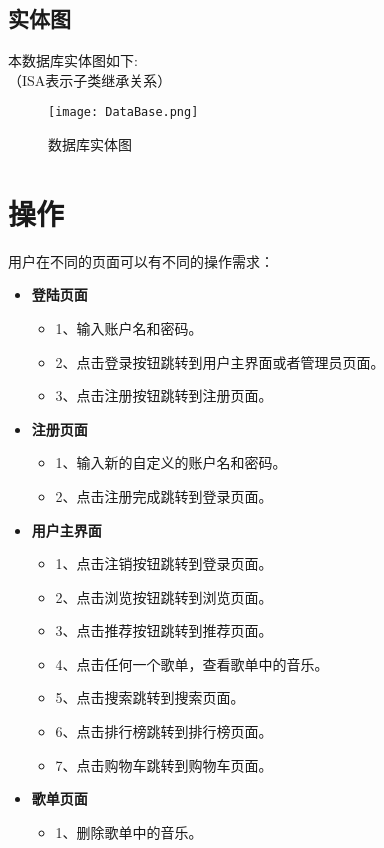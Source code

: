 \subsection{实体图}
本数据库实体图如下:\\
（ISA表示子类继承关系）
\begin{figure}[ht]
	\centering
	\texttt{[image: DataBase.png]}
	\caption{数据库实体图} \label{fig:figure3}
	\end{figure}

\section{操作}

用户在不同的页面可以有不同的操作需求：
\begin{itemize}
	\item \textbf{登陆页面}
	\begin{itemize}
	\item \textbf{}1、输入账户名和密码。
	\item \textbf{}2、点击登录按钮跳转到用户主界面或者管理员页面。
	\item \textbf{}3、点击注册按钮跳转到注册页面。
	\end{itemize}
	\item \textbf{注册页面}
	\begin{itemize}
		\item \textbf{}1、输入新的自定义的账户名和密码。
		\item \textbf{}2、点击注册完成跳转到登录页面。
	\end{itemize}
	\item \textbf{用户主界面}
	\begin{itemize}
		\item \textbf{}1、点击注销按钮跳转到登录页面。
		\item \textbf{}2、点击浏览按钮跳转到浏览页面。
		\item \textbf{}3、点击推荐按钮跳转到推荐页面。
		\item \textbf{}4、点击任何一个歌单，查看歌单中的音乐。
		\item \textbf{}5、点击搜索跳转到搜索页面。
		\item \textbf{}6、点击排行榜跳转到排行榜页面。
		\item \textbf{}7、点击购物车跳转到购物车页面。
	\end{itemize}
	\item \textbf{歌单页面}
	\begin{itemize}
		\item \textbf{}1、删除歌单中的音乐。

\end{itemize}
\end{itemize}
